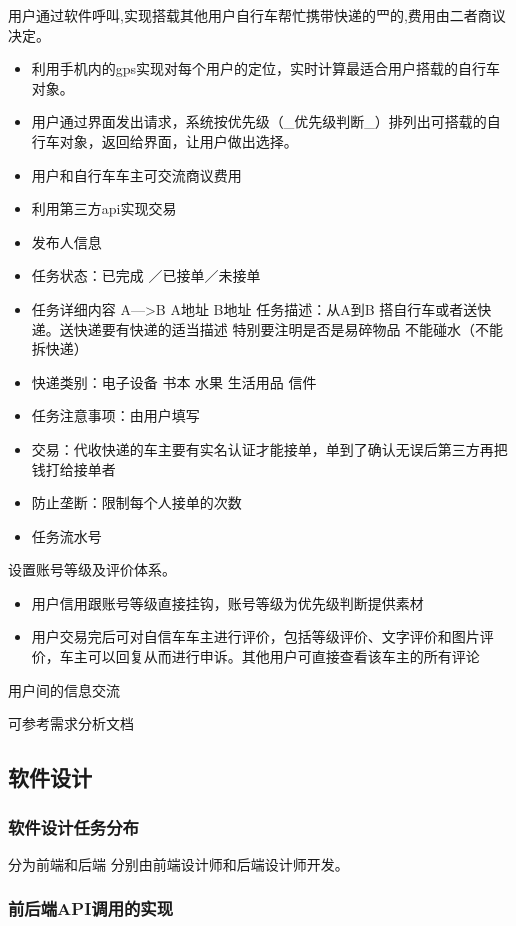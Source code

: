 \documentclass[UTF8]{dingo}
\begin{document}
      用户通过软件呼叫,实现搭载其他用户自行⻋帮忙携带快递的⺫的,费用由二者商议决定。
      \begin{itemize}
        \item 利用手机内的gps实现对每个用户的定位，实时计算最适合用户搭载的自行车对象。
        \item 用户通过界面发出请求，系统按优先级（_优先级判断_）排列出可搭载的自行车对象，返回给界面，让用户做出选择。
        \item 用户和自行车车主可交流商议费用
        \item 利用第三方api实现交易
        \item 发布人信息
        \item 任务状态：已完成 ／已接单／未接单
        \item 任务详细内容 A—>B A地址 B地址 任务描述：从A到B 搭自行车或者送快递。送快递要有快递的适当描述 特别要注明是否是易碎物品 不能碰水（不能拆快递）
        \item 快递类别：电子设备 书本 水果 生活用品 信件
        \item 任务注意事项：由用户填写
        \item 交易：代收快递的车主要有实名认证才能接单，单到了确认无误后第三方再把钱打给接单者
        \item 防止垄断：限制每个人接单的次数
        \item 任务流水号
      \end{itemize}

      设置账号等级及评价体系。
      \begin{itemize}
        \item 用户信用跟账号等级直接挂钩，账号等级为优先级判断提供素材
        \item 用户交易完后可对自信车车主进行评价，包括等级评价、文字评价和图片评价，车主可以回复从而进行申诉。其他用户可直接查看该车主的所有评论
      \end{itemize}

      用户间的信息交流

      可参考需求分析文档
    \subsection{软件设计}
      \subsubsection{软件设计任务分布}
        分为前端和后端 分别由前端设计师和后端设计师开发。
      \subsubsection{前后端API调用的实现}
\end{document}

